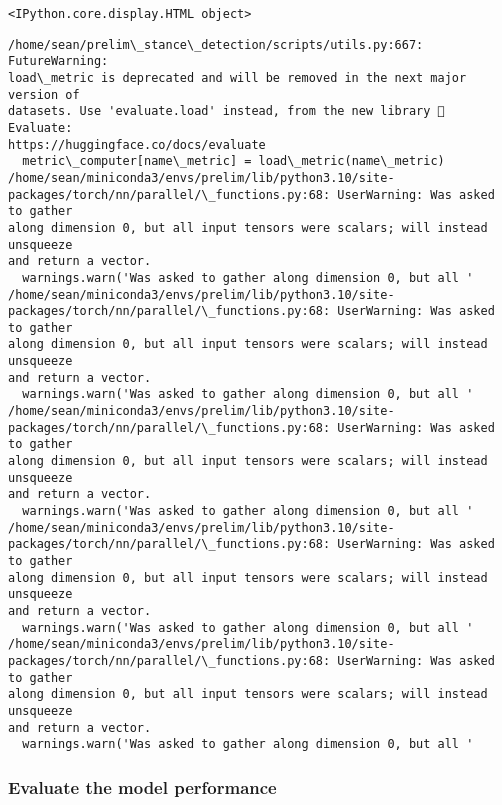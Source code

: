 \documentclass[11pt]{article}
\begin{document}
    
    \begin{Verbatim}[commandchars=\\\{\}]
<IPython.core.display.HTML object>
    \end{Verbatim}

    
    \begin{Verbatim}[commandchars=\\\{\}]
/home/sean/prelim\_stance\_detection/scripts/utils.py:667: FutureWarning:
load\_metric is deprecated and will be removed in the next major version of
datasets. Use 'evaluate.load' instead, from the new library 🤗 Evaluate:
https://huggingface.co/docs/evaluate
  metric\_computer[name\_metric] = load\_metric(name\_metric)
/home/sean/miniconda3/envs/prelim/lib/python3.10/site-
packages/torch/nn/parallel/\_functions.py:68: UserWarning: Was asked to gather
along dimension 0, but all input tensors were scalars; will instead unsqueeze
and return a vector.
  warnings.warn('Was asked to gather along dimension 0, but all '
/home/sean/miniconda3/envs/prelim/lib/python3.10/site-
packages/torch/nn/parallel/\_functions.py:68: UserWarning: Was asked to gather
along dimension 0, but all input tensors were scalars; will instead unsqueeze
and return a vector.
  warnings.warn('Was asked to gather along dimension 0, but all '
/home/sean/miniconda3/envs/prelim/lib/python3.10/site-
packages/torch/nn/parallel/\_functions.py:68: UserWarning: Was asked to gather
along dimension 0, but all input tensors were scalars; will instead unsqueeze
and return a vector.
  warnings.warn('Was asked to gather along dimension 0, but all '
/home/sean/miniconda3/envs/prelim/lib/python3.10/site-
packages/torch/nn/parallel/\_functions.py:68: UserWarning: Was asked to gather
along dimension 0, but all input tensors were scalars; will instead unsqueeze
and return a vector.
  warnings.warn('Was asked to gather along dimension 0, but all '
/home/sean/miniconda3/envs/prelim/lib/python3.10/site-
packages/torch/nn/parallel/\_functions.py:68: UserWarning: Was asked to gather
along dimension 0, but all input tensors were scalars; will instead unsqueeze
and return a vector.
  warnings.warn('Was asked to gather along dimension 0, but all '
    \end{Verbatim}

    \hypertarget{evaluate-the-model-performance}{%
\subsubsection{Evaluate the model
performance}\label{evaluate-the-model-performance}}
\end{document}
